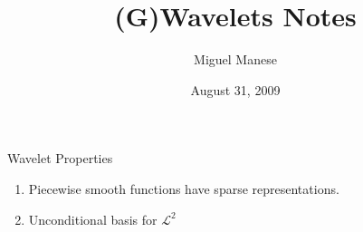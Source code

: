 \documentclass{article}
\title{(G)Wavelets Notes}
\author{Miguel Manese}
\date{August 31, 2009}
\begin{document}
\maketitle

\begin{section}{Wavelet Properties}
\begin{enumerate}
\item Piecewise smooth functions have sparse representations.
\item Unconditional basis for $\mathcal{L}^{2}$
\end{enumerate}
\end{section}
\end{document}
